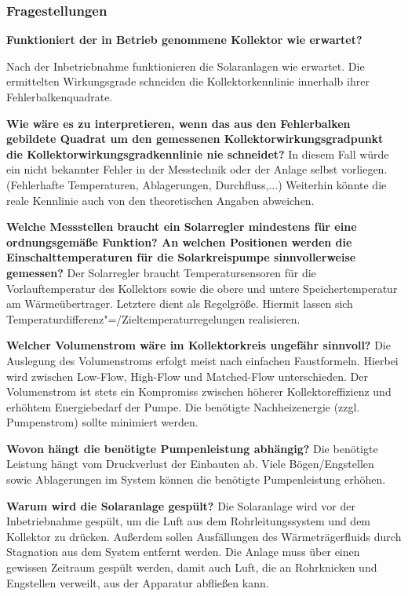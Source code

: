 \subsubsection{Fragestellungen}

\textbf{Funktioniert der in Betrieb genommene Kollektor wie erwartet?}

Nach der Inbetriebnahme funktionieren die Solaranlagen wie erwartet. Die ermittelten Wirkungsgrade schneiden die Kollektorkennlinie innerhalb ihrer Fehlerbalkenquadrate.

\textbf{Wie wäre es zu interpretieren, wenn das aus den Fehlerbalken gebildete Quadrat um den gemessenen Kollektorwirkungsgradpunkt die Kollektorwirkungsgradkennlinie nie schneidet?}
In diesem Fall würde ein nicht bekannter Fehler in der Messtechnik oder der Anlage selbst vorliegen. (Fehlerhafte Temperaturen, Ablagerungen, Durchfluss,...) Weiterhin könnte die reale Kennlinie auch von den theoretischen Angaben abweichen. 

\textbf{Welche Messstellen braucht ein Solarregler mindestens für eine ordnungsgemäße
	Funktion? An welchen Positionen werden die Einschalttemperaturen für die Solarkreispumpe
	sinnvollerweise gemessen?}
Der Solarregler braucht Temperatursensoren für die Vorlauftemperatur des Kollektors sowie die obere und untere Speichertemperatur am Wärmeübertrager. Letztere dient als Regelgröße. Hiermit lassen sich Temperaturdifferenz"=/Zieltemperaturregelungen realisieren. 

\textbf{Welcher Volumenstrom wäre im Kollektorkreis ungefähr sinnvoll?}
Die Auslegung des Volumenstroms erfolgt meist nach einfachen Faustformeln. Hierbei wird zwischen Low-Flow, High-Flow und Matched-Flow unterschieden. Der Volumenstrom ist stets ein Kompromiss zwischen höherer Kollektoreffizienz  und erhöhtem Energiebedarf der Pumpe. Die benötigte Nachheizenergie (zzgl. Pumpenstrom) sollte minimiert werden.

\textbf{Wovon hängt die benötigte Pumpenleistung abhängig?}
Die benötigte Leistung hängt vom Druckverlust der Einbauten ab. Viele Bögen/Engstellen sowie Ablagerungen im System können die benötigte Pumpenleistung erhöhen.

\textbf{Warum wird die Solaranlage gespült?}
Die Solaranlage wird vor der Inbetriebnahme gespült, um die Luft aus dem Rohrleitungssystem und dem Kollektor zu drücken. Außerdem sollen Ausfällungen des Wärmeträgerfluids durch Stagnation aus dem System entfernt werden. Die Anlage muss über einen gewissen Zeitraum gespült werden, damit auch Luft, die an Rohrknicken und Engstellen verweilt, aus der Apparatur abfließen kann. 


